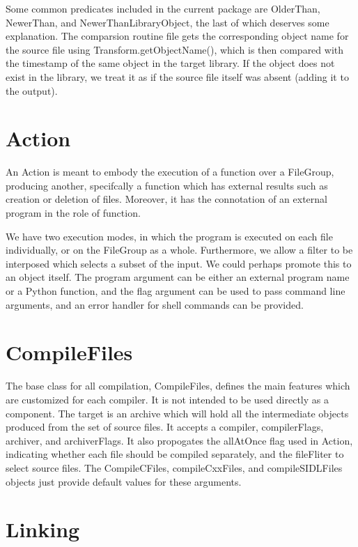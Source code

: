Some common predicates included in the current package are OlderThan, NewerThan, and NewerThanLibraryObject, the last of
which deserves some explanation. The comparsion routine file gets the corresponding object name for the source file
using Transform.getObjectName(), which is then compared with the timestamp of the same object in the target library. If
the object does not exist in the library, we treat it as if the source file itself was absent (adding it to the output).

\section{Action}

An Action is meant to embody the execution of a function over a FileGroup, producing another, specifcally a function
which has external results such as creation or deletion of files. Moreover, it has the connotation of an external
program in the role of function.

We have two execution modes, in which the program is executed on each file individually, or on the FileGroup as a
whole. Furthermore, we allow a filter to be interposed which selects a subset of the input. We could perhaps promote
this to an object itself. The program argument can be either an external program name or a Python function, and the flag
argument can be used to pass command line arguments, and an error handler for shell commands can be provided.

\section{CompileFiles}

The base class for all compilation, CompileFiles, defines the main features which are customized for each compiler. It
is not intended to be used directly as a component. The target is an archive which will hold all the intermediate
objects produced from the set of source files. It accepts a compiler, compilerFlags, archiver, and archiverFlags. It
also propogates the allAtOnce flag used in Action, indicating whether each file should be compiled separately, and the
fileFliter to select source files. The CompileCFiles, compileCxxFiles, and compileSIDLFiles objects just provide default
values for these arguments.

\section{Linking}

